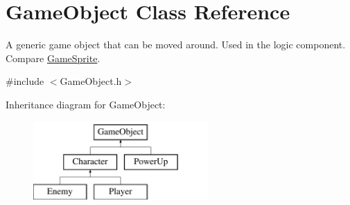 \hypertarget{class_game_object}{}\section{Game\+Object Class Reference}
\label{class_game_object}


A generic game object that can be moved around. Used in the logic component. Compare \mbox{\hyperlink{class_game_sprite}{Game\+Sprite}}.  




{\ttfamily \#include $<$Game\+Object.\+h$>$}

Inheritance diagram for Game\+Object\+:\begin{figure}[H]
\begin{center}
\leavevmode
\includegraphics[height=3.000000cm]{class_game_object}
\end{center}
\end{figure}
